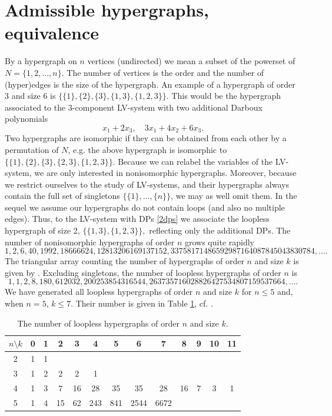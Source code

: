 \documentclass{article}
\begin{document}
\section{Admissible hypergraphs, equivalence} \label{s3}
By a hypergraph on $n$ vertices (undirected) we mean a subset of the powerset of $N=\{1,2,\ldots,n\}$. The number of vertices is the order and the number of (hyper)edges is the size of the hypergraph. An example of a hypergraph of order $3$ and size $6$ is
$
\{\{1\},\{2\},\{3\},\{1,3\},\{1,2,3\}\}.
$
This would be the hypergraph associated to the $3$-component LV-system with two additional Darboux polynomials
\begin{equation} \label{2dps}
x_1+2x_3,\quad 3x_1+4x_2+6x_3.
\end{equation}
Two hypergraphs are isomorphic if they can be obtained from each other by a permutation of $N$, e.g. the above hypergraph is isomorphic to $\{\{1\},\{2\},\{3\},\{2,3\},\{1,2,3\}\}$.
Because we can relabel the variables of the LV-system, we are only interested in nonisomorphic hypergraphs. Moreover, because we restrict ourselves to the study of LV-systems, and their hypergraphs always contain the full set of singletons $\{\{1\},\ldots,\{n\}\}$, we may as well omit them. In the sequel we assume our hypergraphs do not contain loops (and also no multiple edges). Thus, to the LV-system with DPs \eqref{2dps} we associate the loopless hypergraph of size 2,
$
\{\{1,3\},\{1,2,3\}\},
$
reflecting only the additional DPs. The number of nonisomorphic hypergraphs of order $n$ grows quite rapidly \cite[A000612]{OEIS}
\[
1, 2, 6, 40, 1992, 18666624, 12813206169137152, 33758171486592987164087845043830784, \ldots.
\]
The triangular array counting the number of hypergraphs of order $n$ and size $k$ is given by
\cite[A371830]{OEIS}. Excluding  singletons, the number of loopless hypergraphs of order $n$ is \cite[A317794]{OEIS}
\[
1, 1, 2, 8, 180, 612032, 200253854316544, 263735716028826427534807159537664, \ldots.
\]
We have generated all loopless hypergraphs of order $n$ and size $k$ for $n\leq 5$ and, when $n=5$, $k\leq 7$. Their number is given in Table \ref{nhg}, cf. \cite{HS}.

\begin{table}[h]
\begin{center}
\begin{tabular}{c|cccccccccccc}
$n \setminus k$ & 0 & 1 & 2 & 3 & 4 & 5 & 6 & 7 & 8 & 9 & 10 & 11\\
\hline
2 & 1 & 1 & & & & & & & & & & \\
3 & 1 & 2 & 2 & 2 & 1 & & & & & & &\\
4 & 1 & 3 & 7 & 16 & 28 & 35 & 35 & 28 & 16 & 7 & 3 & 1\\
5 &1 & 4 & 15 & 62 & 243 & 841 & 2544 & 6672 & & & \\
\end{tabular}
\vspace{3mm}

\parbox{12.5cm}{\caption{\label{nhg} The number of loopless hypergraphs of order $n$ and size $k$.}}
\end{center}
\end{table}
\vspace{-8pt} 
\end{document}
